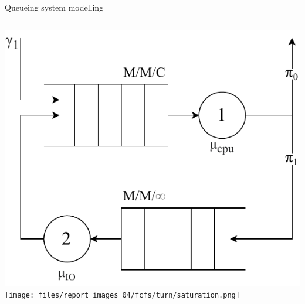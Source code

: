 \documentclass[aspectratio=169,xcolor=dvipsnames]{beamer}
\begin{document}
\begin{frame}{Queueing system modelling}
\begin{columns}[c]
        \hspace{0.4em}\includegraphics[height=.4\textheight]{files/queue_schema.pdf}
        \texttt{[image: files/report\_images\_04/fcfs/turn/saturation.png]}
    \end{columns}
\end{frame}

\end{document}
